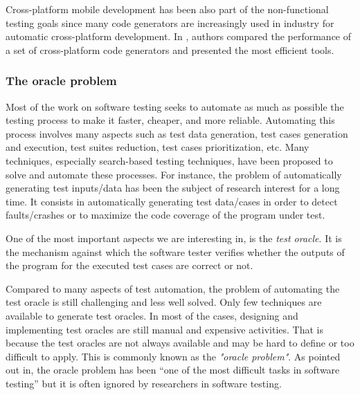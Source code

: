 Cross-platform mobile development has been also part of the non-functional testing goals since many code generators are increasingly used in industry for automatic cross-platform development. In \cite{pazirandeh2015evaluation,hartmann2011cross}, authors compared the performance of a set of cross-platform code generators and presented the most efficient tools.



\subsubsection{The oracle problem}

Most of the work on software testing seeks to automate as much as possible the testing process to make it faster, cheaper, and more reliable. 
Automating this process involves many aspects such as test data generation, test cases generation and execution, test suites reduction, test cases prioritization, etc. Many techniques, especially search-based testing techniques, have been proposed to solve and automate these processes\cite{ali2010systematic}.
For instance, the problem of automatically generating test inputs/data has been the subject of research interest for a long time. It consists in automatically generating test data/cases in order to detect faults/crashes or to maximize the code coverage of the program under test. 

One of the most important aspects we are interesting in, is the \textit{test oracle}. It is the mechanism against which the software tester verifies whether the outputs of the program for the executed test cases are correct or not.

Compared to many aspects of test automation, the problem of automating the test oracle is still challenging and less well solved. Only few techniques are available to generate test oracles. In most of the cases, designing and implementing test oracles are still manual and expensive activities. That is because the test oracles are not always available and may be hard to define or too difficult to apply\cite{barr2015oracle}. This is commonly known as the \textit{"oracle problem"}. 
As pointed out in\cite{manolache2001software}, the oracle problem has been “one of the most difficult tasks in software testing” but it is often ignored by researchers in software testing.

